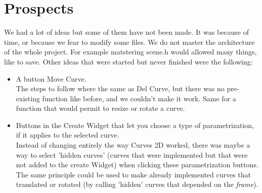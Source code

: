 \documentclass{article}
\begin{document}
\section*{Prospects}
We had a lot of ideas but some of them have not been made. It was because of time, or because we fear to modify some files. We do not master the architecture of the whole project. For example matstering scene.h would allowed many things, like to save.
Other ideas that were started but never finished were the following:
\begin{itemize}
    \item A button Move Curve. \\The steps to follow where the same as Del Curve, but there was no pre-existing function like before, and we couldn't make it work. Same for a function that would permit to resize or rotate a curve.
    \item Buttons in the Create Widget that let you choose a type of parametrization, if it applies to the selected curve. \\ Instead of changing entirely the way Curves 2D worked, there was maybe a way to select 'hidden curves' (curves that were implemented but that were not added to the create Widget) when clicking these parametrization buttons. The same principle could be used to make already implemented curves that translated or rotated (by calling 'hidden' curves that depended on the \textit{frame}).
\end{itemize}
\end{document}
